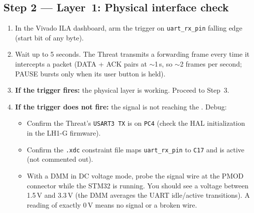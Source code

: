 \documentclass[11pt,letterpaper]{article}
\begin{document}

\subsection{Step 2 --- Layer~1: Physical interface check}
\begin{enumerate}[leftmargin=2em]
	\item In the Vivado \mbox{ILA} dashboard, arm the trigger on \texttt{uart\_rx\_pin} falling edge (start bit of any byte).
	\item Wait up to 5 seconds. The Threat transmits a forwarding frame every time it intercepts a packet (DATA + ACK pairs at $\sim$1\,s, so $\sim$2 frames per second; PAUSE bursts only when its user button is held).
	\item \textbf{If the trigger fires:} the physical layer is working. Proceed to Step~3.
	\item \textbf{If the trigger does not fire:} the signal is not reaching the \FPGA{}. Debug:
	\begin{itemize}[leftmargin=1.2em]
		\item Confirm the Threat's \texttt{USART3 TX} is on \texttt{PC4} (check the HAL initialization in the LH1-G firmware).
		\item Confirm the \texttt{.xdc} constraint file maps \texttt{uart\_rx\_pin} to \texttt{C17} and is active (not commented out).
		\item With a \mbox{DMM} in \mbox{DC} voltage mode, probe the signal wire at the \mbox{PMOD} connector while the STM32 is running. You should see a voltage between 1.5\,V and 3.3\,V (the \mbox{DMM} averages the \mbox{UART} idle/active transitions). A reading of exactly 0\,V means no signal or a broken wire.
	\end{itemize}
\end{enumerate}
\end{document}

